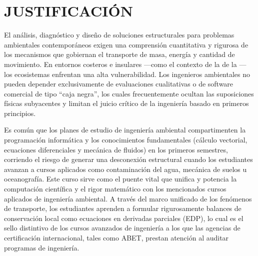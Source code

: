 \section{JUSTIFICACIÓN}
El análisis, diagnóstico y diseño de soluciones estructurales para problemas ambientales contemporáneos exigen una comprensión cuantitativa y rigurosa de los mecanismos que gobiernan el transporte de masa, energía y cantidad de movimiento.  En entornos costeros e insulares ---como el contexto de la \Region de la \Institution--- los ecosistemas enfrentan una alta vulnerabilidad.  Los ingenieros ambientales no pueden depender exclusivamente de evaluaciones cualitativas o de software comercial de tipo ``caja negra'', los cuales frecuentemente ocultan las suposiciones físicas subyacentes y limitan el juicio crítico de la ingeniería basado en primeros principios.

Es común que los planes de estudio de ingeniería ambiental compartimenten la programación informática y los conocimientos fundamentales (cálculo vectorial, ecuaciones diferenciales y mecánica de fluidos) en los primeros semestres, corriendo el riesgo de generar una desconexión estructural cuando los estudiantes avanzan a cursos aplicados como contaminación del agua, mecánica de suelos u oceanografía.  Este curso sirve como el puente vital que unifica y potencia la computación científica y el rigor matemático con los mencionados cursos aplicados de ingeniería ambiental.  A través del marco unificado de los fenómenos de transporte, los estudiantes aprenden a formular rigurosamente balances de conservación local como ecuaciones en derivadas parciales (EDP), lo cual es el sello distintivo de los cursos avanzados de ingeniería a los que las agencias de certificación internacional, tales como ABET, prestan atención al auditar programas de ingeniería.

